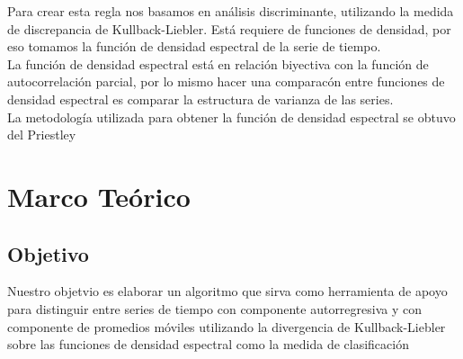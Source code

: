 \documentclass[12pt,oneside]{book}
\begin{document}
Para crear esta regla nos basamos en an\'alisis discriminante, utilizando la medida de discrepancia de Kullback-Liebler. Est\'a requiere de funciones de densidad, por eso tomamos la funci\'on de densidad espectral de la serie de tiempo.\\

La funci\'on de densidad espectral est\'a en relaci\'on biyectiva con la funci\'on de autocorrelaci\'on parcial, por lo mismo hacer una comparac\'on entre funciones de densidad espectral es comparar la estructura de varianza de las series.\\

La metodolog\'ia utilizada para obtener la funci\'on de densidad espectral se obtuvo del Priestley





\setcounter{page}{0}
\chapter{Marco Te\'orico} %
\label{cha:marco_teorico}

\section{Objetivo} %
\label{sec:objetivo}
Nuestro objetvio es elaborar un algoritmo que sirva como herramienta de apoyo para distinguir entre series de tiempo con componente autorregresiva y con componente de promedios m\'oviles utilizando la divergencia de Kullback-Liebler sobre las funciones de densidad espectral como la medida de clasificaci\'on 
\end{document}
